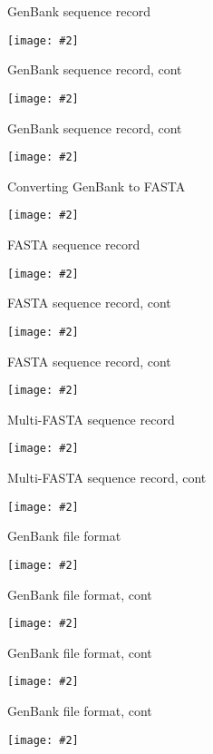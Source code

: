 \documentclass{beamer}
\renewcommand{\c}[1]{\begin{center}#1\end{center}}
\newcommand{\gr}[2][.95]{\c{\texttt{[image: \#2]}}}
\begin{document}
\begin{frame}{GenBank sequence record}
\gr{l2_figs/s21_genbank_record1.png}
\end{frame}

\begin{frame}{GenBank sequence record, cont}
\gr{l2_figs/s21_genbank_record2.png}
\end{frame}

\begin{frame}{GenBank sequence record, cont}
\gr{l2_figs/s21_genbank_record3.png}
\end{frame}

\begin{frame}{Converting GenBank to FASTA}
\gr{l2_figs/s21_genbank_record4.png}
\end{frame}

\begin{frame}{FASTA sequence record}
\gr{l2_figs/s24_fasta1.png}
\end{frame}

\begin{frame}{FASTA sequence record, cont}
\gr{l2_figs/s24_fasta2.png}
\end{frame}

\begin{frame}{FASTA sequence record, cont}
\gr{l2_figs/s24_fasta3.png}
\end{frame}

\begin{frame}{Multi-FASTA sequence record}
\gr{l2_figs/s26_multifasta1.png}
\end{frame}

\begin{frame}{Multi-FASTA sequence record, cont}
\gr{l2_figs/s26_multifasta2.png}
\end{frame}

\begin{frame}{GenBank file format}
\gr{l2_figs/s27_features1.png}
\end{frame}

\begin{frame}{GenBank file format, cont}
\gr{l2_figs/s27_features2.png}
\end{frame}

\begin{frame}{GenBank file format, cont}
\gr{l2_figs/s28_more_genbank1.png}
\end{frame}

\begin{frame}{GenBank file format, cont}
\gr{l2_figs/s28_more_genbank2.png}
\end{frame}
\end{document}
